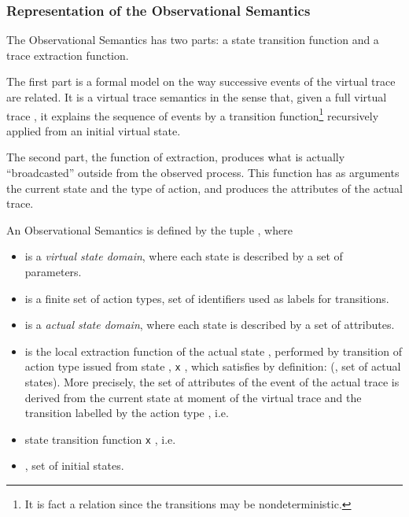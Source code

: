 \subsubsection{Representation of the Observational Semantics}

The Observational Semantics has two parts: a state transition function and a trace extraction function.

The first part is a formal model on the way successive events of the virtual trace are related. 
It is a virtual trace semantics in the sense that, given a full virtual trace \newline , it explains the sequence of events  by a transition function\footnote{It is fact a relation since the transitions may be nondeterministic.} recursively applied from an initial virtual state.



\vspace{1mm}
The second part, the function of extraction, produces what is actually ``broadcasted'' outside from the observed process. This function has as arguments the current state and the type of action, and produces the attributes of the actual trace.

\begin{definition} 

An Observational Semantics is defined by the tuple , where
\begin{itemize}
\item  is a  {\em virtual state domain}, where each state is described by a set of parameters.
\item  is a finite set of action types, set of identifiers used as labels for transitions.
\item  is a {\em actual state domain}, where each state is described by a set of attributes.
\item  is the local extraction function of the actual state , performed by transition of action type  issued from state ,  {\tt x} , which satisfies by definition:  (, set of actual states). More precisely, the set of attributes  of the event  of the actual trace is derived from the current state at moment  of the virtual trace and the transition labelled by the action type , i.e.
\begin{quote}

\end{quote}
\item  state transition function  {\tt x} , i.e.
\begin{quote}

\end{quote}
\item , set of initial states.
\end{itemize}
\end{definition}

